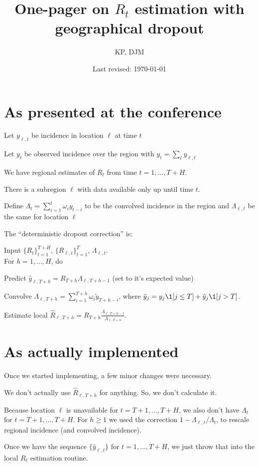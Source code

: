 \documentclass[12pt]{article}
\title{One-pager on $R_t$ estimation with geographical dropout}
\author{KP, DJM}
\date{Last revised: \today}
\begin{document}
\maketitle


\section{As presented at the conference}\label{sec:proof}

\bitem[nosep]
\item Let $y_{\ell,t}$ be incidence in location $\ell$ at time $t$
\item Let $y_t$ be observed incidence over the region with $y_t = \sum_{\ell}
y_{\ell, t}$ 
\item We have regional estimates of $R_t$ from time $t=1,\ldots,T + H$.
\item There is a subregion $\ell$ with data available only up until time $t$.
\item Define $\Lambda_t = \sum_{i=1}^{t} \omega_{i}y_{t-i}$ to be the convolved
incidence in the region and $\Lambda_{\ell,t}$ be the same for location $\ell$
\eitem

The ``deterministic dropout correction'' is:

Input $\{R_t\}_{t=1}^{T+H}$, $\{R_{\ell, t}\}_{t=1}^{T}$, $\Lambda_{\ell,t}$.\\
For $h = 1,\ldots,H$, do
\benum[nosep]
\item Predict $\hat{y}_{\ell,T + h} = R_{T+h}\Lambda_{\ell,T+h-1}$ (set to it's
expected value)
\item Convolve $\Lambda_{\ell,T+h} = \sum_{i=1}^{T+h} \omega_{i}\tilde{y}_{T + h
- i}$, where $\tilde{y}_j = y_j \1[j\leq T] + \hat{y}_j \1[j>T]$.
\item Estimate local $\hat{R}_{\ell,T+h} = R_{T+h} \frac{\Lambda_{\ell, T+h-1}}
{\Lambda_{\ell, T+h}}$.
\eenum

\section{As actually implemented}

Once we started implementing, a few minor changes were necessary.

\bitem[nosep]
\item We don't actually use $\hat{R}_{\ell,T+h}$ for anything. So, we don't
calculate it. 
\item Because location $\ell$ is unavailable for $t=T+1,\ldots,T+H$, we also
don't have $\Lambda_t$ for $t=T+1,\ldots,T+H$. For $h \geq 1$ we used the
correction $1 - \Lambda_{\ell,t}/\Lambda_{t}$, to rescale regional incidence
(and convolved incidence).
\item Once we have the sequence $\{\hat{y}_{\ell,t}\}$ for $t=1,\ldots,T+H$, we
just throw that into the local $R_t$ estimation routine.
\eitem
\end{document}
